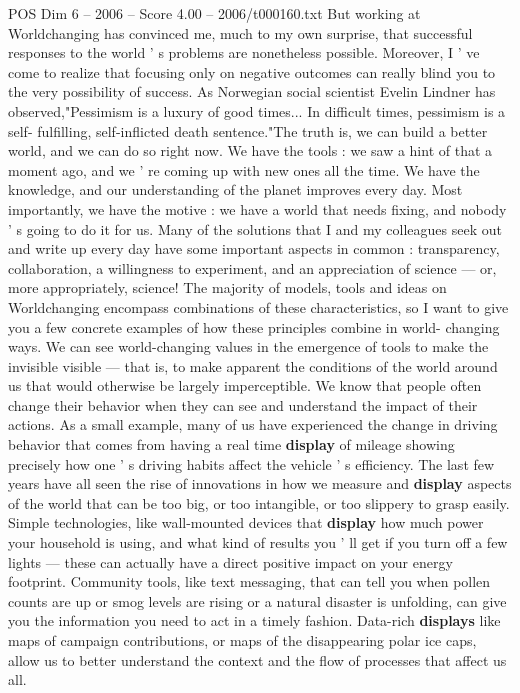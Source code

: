 \begin{textsample}{POS Dim 6 – 2006 – Score 4.00 – 2006/t000160.txt}
But working at Worldchanging has convinced me, much to my own surprise, that successful responses to the world ' s problems are nonetheless possible.
Moreover, I ' ve come to realize that focusing only on negative outcomes can really blind you to the very possibility of success.
As Norwegian social scientist Evelin Lindner has observed,"Pessimism is a luxury of good times...
In difficult times, pessimism is a self- fulfilling, self-inflicted death sentence."The truth is, we can build a better world, and we can do so right now.
We have the tools : we saw a hint of that a moment ago, and we ' re coming up with new ones all the time.
We have the knowledge, and our understanding of the planet improves every day.
Most importantly, we have the motive : we have a world that needs fixing, and nobody ' s going to do it for us.
Many of the solutions that I and my colleagues seek out and write up every day have some important aspects in common : transparency, collaboration, a willingness to experiment, and an appreciation of science — or, more appropriately, science!
The majority of models, tools and ideas on Worldchanging encompass combinations of these characteristics, so I want to give you a few concrete examples of how these principles combine in world- changing ways.
We can see world-changing values in the emergence of tools to make the invisible visible — that is, to make apparent the conditions of the world around us that would otherwise be largely imperceptible.
We know that people often change their behavior when they can see and understand the impact of their actions.
As a small example, many of us have experienced the change in driving behavior that comes from having a real time \textbf{display} of mileage showing precisely how one ' s driving habits affect the vehicle ' s efficiency.
The last few years have all seen the rise of innovations in how we measure and \textbf{display} aspects of the world that can be too big, or too intangible, or too slippery to grasp easily.
Simple technologies, like wall-mounted devices that \textbf{display} how much power your household is using, and what kind of results you ' ll get if you turn off a few lights — these can actually have a direct positive impact on your energy footprint.
Community tools, like text messaging, that can tell you when pollen counts are up or smog levels are rising or a natural disaster is unfolding, can give you the information you need to act in a timely fashion.
Data-rich \textbf{displays} like maps of campaign contributions, or maps of the disappearing polar ice caps, allow us to better understand the context and the flow of processes that affect us all.

\end{textsample}
